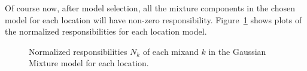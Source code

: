 Of course now, after model selection, all the mixture components in the chosen model for each location 
will have non-zero responsibility. Figure~\ref{fig:Responsibilities} shows plots of the 
normalized responsibilities for each location model. 

\begin{figure}[!h]
	\centering
	\caption{Normalized responsibilities $N_k$ of each mixand $k$ in the Gaussian Mixture model for each location.}
	\label{fig:Responsibilities}
\end{figure}









